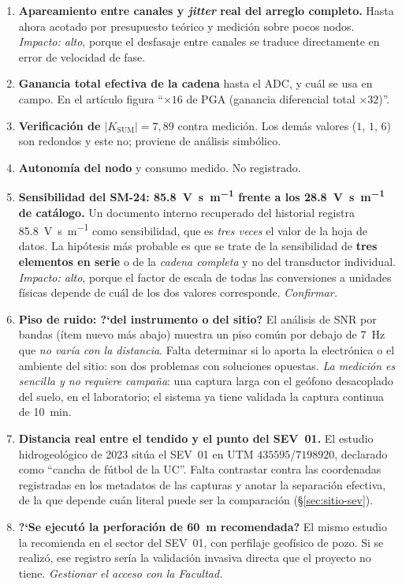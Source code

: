 \begin{enumerate}[itemsep=0.35em]
\item \textbf{Apareamiento entre canales y \emph{jitter} real del arreglo completo.}
Hasta ahora acotado por presupuesto te\'orico y medici\'on sobre pocos nodos.
\emph{Impacto: alto}, porque el desfasaje entre canales se traduce directamente en error
de velocidad de fase.

\item \textbf{Ganancia total efectiva de la cadena} hasta el ADC, y cu\'al se usa en campo.
En el art\'iculo figura ``$\times16$ de PGA (ganancia diferencial total $\times32$)''.

\item \textbf{Verificaci\'on de $|K_{\mathrm{SUM}}|=7{,}89$} contra medici\'on. Los dem\'as
valores ($1$, $1$, $6$) son redondos y este no; proviene de an\'alisis simb\'olico.

\item \textbf{Autonom\'ia del nodo} y consumo medido. No registrado.

\item \textbf{Sensibilidad del SM-24: \SI{85.8}{\volt\second\per\meter} frente a los
\SI{28.8}{\volt\second\per\meter} de cat\'alogo.} Un documento interno recuperado del
historial registra \SI{85.8}{\volt\second\per\meter} como sensibilidad, que es
\emph{tres veces} el valor de la hoja de datos. La hip\'otesis m\'as probable es que se
trate de la sensibilidad de \textbf{tres elementos en serie} o de la \emph{cadena
completa} y no del transductor individual. \emph{Impacto: alto}, porque el factor de
escala de todas las conversiones a unidades f\'isicas depende de cu\'al de los dos valores
corresponde. \emph{Confirmar.}

\item \textbf{Piso de ruido: ?`del instrumento o del sitio?} El an\'alisis de SNR por
bandas (\'item nuevo m\'as abajo) muestra un piso com\'un por debajo de \SI{7}{\hertz} que
\emph{no var\'ia con la distancia}. Falta determinar si lo aporta la electr\'onica o el
ambiente del sitio: son dos problemas con soluciones opuestas. \emph{La medici\'on es
sencilla y no requiere campa\~na}: una captura larga con el ge\'ofono desacoplado del
suelo, en el laboratorio; el sistema ya tiene validada la captura continua de
\SI{10}{\minute}.

\item \textbf{Distancia real entre el tendido y el punto del SEV~01.} El estudio
hidrogeol\'ogico de 2023 sit\'ua el SEV~01 en UTM $435595$/$7198920$, declarado como
``cancha de f\'utbol de la UC''. Falta contrastar contra las coordenadas registradas en
los metadatos de las capturas y anotar la separaci\'on efectiva, de la que depende
cu\'an literal puede ser la comparaci\'on (\S\ref{sec:sitio-sev}).

\item \textbf{?`Se ejecut\'o la perforaci\'on de \SI{60}{\meter} recomendada?} El mismo
estudio la recomienda en el sector del SEV~01, con perfilaje geof\'isico de pozo. Si se
realiz\'o, ese registro ser\'ia la validaci\'on invasiva directa que el proyecto no
tiene. \emph{Gestionar el acceso con la Facultad.}

\end{enumerate}

